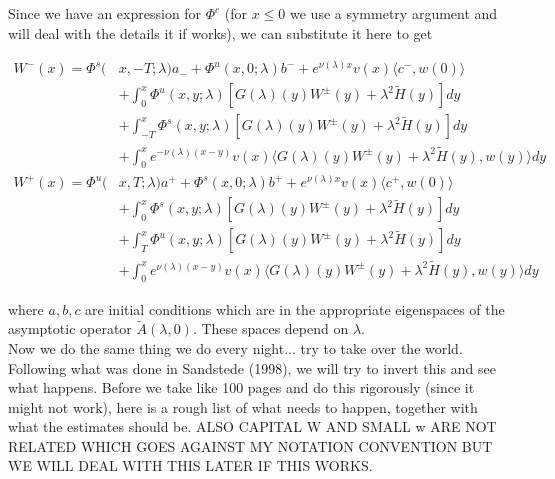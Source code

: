 \documentclass[12pt]{article}
\begin{document}
Since we have an expression for $\Phi^c$ (for $x \leq 0$ we use a symmetry argument and will deal with the details it if works), we can substitute it here to get

\begin{align*}
W^-(x) = \Phi^s(&x, -T; \lambda)a_- + \Phi^u(x, 0; \lambda)b^- + e^{\nu(\lambda)x} v(x) \langle c^-, w(0) \rangle  \\
&+ \int_0^x \Phi^u(x, y; \lambda)[ G(\lambda)(y)W^\pm(y) + \lambda^2 \tilde{H}(y) ] dy \\
&+ \int_{-T}^x \Phi^s(x, y; \lambda) [ G(\lambda)(y)W^\pm(y) + \lambda^2 \tilde{H}(y) ] dy \\
&+ \int_0^x 
e^{-\nu(\lambda)(x-y)} v(x) \langle G(\lambda)(y)W^\pm(y) + \lambda^2 \tilde{H}(y), w(y) \rangle dy \\
W^+(x) = \Phi^u(&x, T; \lambda)a^+ + \Phi^s(x, 0; \lambda)b^+ + e^{\nu(\lambda)x} v(x) \langle c^+, w(0) \rangle  \\
&+ \int_0^x \Phi^s(x, y; \lambda) [ G(\lambda)(y)W^\pm(y) + \lambda^2 \tilde{H}(y) ] dy \\
&+ \int_T^x \Phi^u(x, y; \lambda) [ G(\lambda)(y)W^\pm(y) + \lambda^2 \tilde{H}(y) ] dy \\
&+ \int_0^x 
e^{\nu(\lambda)(x-y)} v(x) \langle G(\lambda)(y)W^\pm(y) + \lambda^2 \tilde{H}(y), w(y) \rangle  dy
\end{align*}

where $a, b, c$ are initial conditions which are in the appropriate eigenspaces of the asymptotic operator $\tilde{A}(\lambda, 0)$. These spaces depend on $\lambda$.\\

Now we do the same thing we do every night... try to take over the world. Following what was done in Sandstede (1998), we will try to invert this and see what happens. Before we take like 100 pages and do this rigorously (since it might not work), here is a rough list of what needs to happen, together with what the estimates should be. ALSO CAPITAL W AND SMALL w ARE NOT RELATED WHICH GOES AGAINST MY NOTATION CONVENTION BUT WE WILL DEAL WITH THIS LATER IF THIS WORKS.
\end{document}
